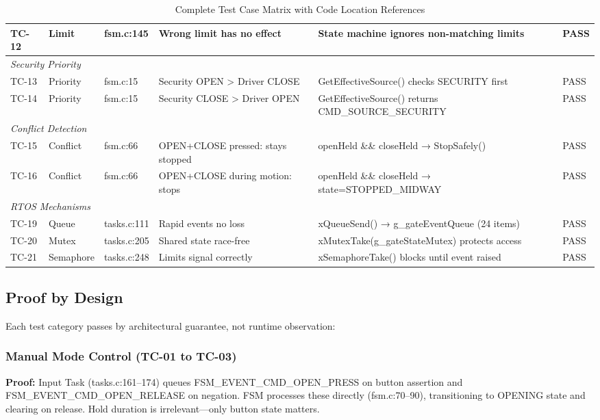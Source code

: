 \documentclass[11pt,a4paper]{article}
\begin{document}
\begin{table}[H]
\begin{tabularx}{\textwidth}{llllXl}
TC-12 & Limit & fsm.c:145 & Wrong limit has no effect & State machine ignores non-matching limits & PASS \\
\midrule
\multicolumn{6}{l}{\textit{Security Priority}} \\
TC-13 & Priority & fsm.c:15 & Security OPEN \textgreater{} Driver CLOSE & GetEffectiveSource() checks SECURITY first & PASS \\
TC-14 & Priority & fsm.c:15 & Security CLOSE \textgreater{} Driver OPEN & GetEffectiveSource() returns CMD\_SOURCE\_SECURITY & PASS \\
\midrule
\multicolumn{6}{l}{\textit{Conflict Detection}} \\
TC-15 & Conflict & fsm.c:66 & OPEN+CLOSE pressed: stays stopped & openHeld \&\& closeHeld → StopSafely() & PASS \\
TC-16 & Conflict & fsm.c:66 & OPEN+CLOSE during motion: stops & openHeld \&\& closeHeld → state=STOPPED\_MIDWAY & PASS \\
\midrule
\multicolumn{6}{l}{\textit{RTOS Mechanisms}} \\
TC-19 & Queue & tasks.c:111 & Rapid events no loss & xQueueSend() → g\_gateEventQueue (24 items) & PASS \\
TC-20 & Mutex & tasks.c:205 & Shared state race-free & xMutexTake(g\_gateStateMutex) protects access & PASS \\
TC-21 & Semaphore & tasks.c:248 & Limits signal correctly & xSemaphoreTake() blocks until event raised & PASS \\
\bottomrule
\end{tabularx}
\caption{Complete Test Case Matrix with Code Location References}
\label{tab:test-matrix}
\end{table}

\subsection{Proof by Design}

Each test category passes by architectural guarantee, not runtime observation:

\subsubsection{Manual Mode Control (TC-01 to TC-03)}\textbf{Proof:} Input Task (tasks.c:161--174) queues FSM\_EVENT\_CMD\_OPEN\_PRESS on button assertion and FSM\_EVENT\_CMD\_OPEN\_RELEASE on negation. FSM processes these directly (fsm.c:70--90), transitioning to OPENING state and clearing on release. Hold duration is irrelevant---only button state matters.
\end{document}
